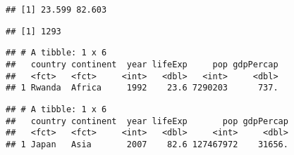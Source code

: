 \documentclass[]{article}
\newenvironment{Shaded}{\begin{snugshade}}{\end{snugshade}}
\newcommand{\KeywordTok}[1]{\textcolor[rgb]{0.13,0.29,0.53}{\textbf{#1}}}
\newcommand{\StringTok}[1]{\textcolor[rgb]{0.31,0.60,0.02}{#1}}
\newcommand{\CommentTok}[1]{\textcolor[rgb]{0.56,0.35,0.01}{\textit{#1}}}
\newcommand{\OperatorTok}[1]{\textcolor[rgb]{0.81,0.36,0.00}{\textbf{#1}}}
\newcommand{\NormalTok}[1]{#1}
\begin{document}
\begin{verbatim}
## [1] 23.599 82.603
\end{verbatim}

\begin{Shaded}
\end{Shaded}

\begin{verbatim}
## [1] 1293
\end{verbatim}

\begin{Shaded}
\end{Shaded}

\begin{verbatim}
## # A tibble: 1 x 6
##   country continent  year lifeExp     pop gdpPercap
##   <fct>   <fct>     <int>   <dbl>   <int>     <dbl>
## 1 Rwanda  Africa     1992    23.6 7290203      737.
\end{verbatim}

\begin{Shaded}
\end{Shaded}

\begin{verbatim}
## # A tibble: 1 x 6
##   country continent  year lifeExp       pop gdpPercap
##   <fct>   <fct>     <int>   <dbl>     <int>     <dbl>
## 1 Japan   Asia       2007    82.6 127467972    31656.
\end{verbatim}
\end{document}
